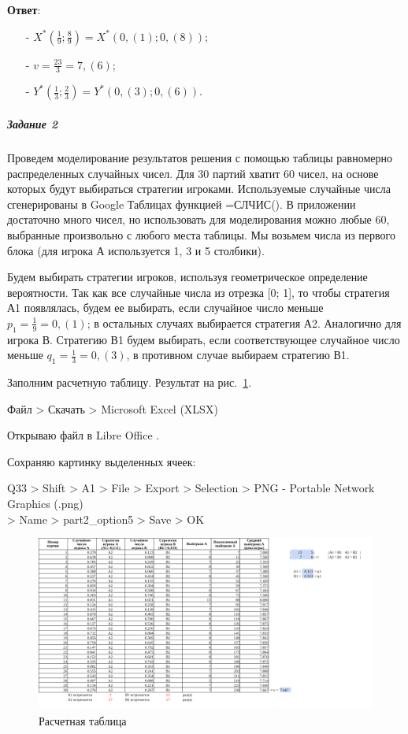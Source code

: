 \textbf{Ответ}: 
\begin{enumerate}
  \item[-] $X^*(\frac{1}{9}; \frac{8}{9}) = X^*(0,(1); 0,(8))$;
  \item[-] $v = \frac{23}{3} = 7,(6)$;
  \item[-] $Y^*(\frac{1}{3}; \frac{2}{3}) = Y^*(0,(3); 0,(6))$.
\end{enumerate}

\subparagraph{Задание 2} \hspace{0pt}

Проведем моделирование результатов решения с помощью таблицы равномерно распределенных случайных чисел.
Для 30 партий хватит 60 чисел, на основе которых будут выбираться стратегии игроками.
Используемые случайные числа сгенерированы в Google Таблицах \cite{GoogleTables} функцией =СЛЧИС().
В приложении достаточно много чисел, но использовать для моделирования можно любые 60, выбранные произвольно с любого места таблицы.
Мы возьмем числа из первого блока (для игрока А используется 1, 3 и 5 столбики).

Будем выбирать стратегии игроков, используя геометрическое определение вероятности.
Так как все случайные числа из отрезка [0; 1], то чтобы стратегия А1 появлялась,
будем ее выбирать, если случайное число меньше $p_1 = \frac{1}{9} = 0,(1)$;
в остальных случаях выбирается стратегия А2.
Аналогично для игрока В.
Стратегию В1 будем выбирать, если соответствующее случайное число меньше $q_1 = \frac{1}{3} = 0,(3)$, в противном случае выбираем стратегию В1.

Заполним расчетную таблицу. Результат на рис.~\ref{fig:part2_option5}.

Файл > Скачать > Microsoft Excel (XLSX)

Открываю файл в Libre Office \cite{LibreOffice}.

Сохраняю картинку выделенных ячеек:

Q33 > Shift > A1 > File > Export > Selection > PNG - Portable Network Graphics (.png) \\
> Name > part2\_option5 > Save > OK

\begin{figure}[!h]
  \centering

  \includegraphics[width=18cm]
  {../sources/part2_option5.png}

  \caption{Расчетная таблица}

  \label{fig:part2_option5}
\end{figure}

